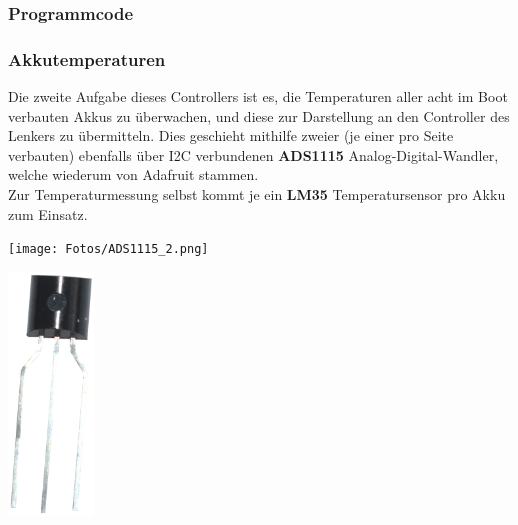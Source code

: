 \newpage
\subsubsection{Programmcode}

\newpage

\subsubsection{Akkutemperaturen}
Die zweite Aufgabe dieses Controllers ist es, die Temperaturen aller acht im Boot verbauten Akkus zu überwachen, und diese zur Darstellung an den Controller des Lenkers zu übermitteln.
Dies geschieht mithilfe zweier (je einer pro Seite verbauten) ebenfalls über I2C verbundenen \textbf{ADS1115} Analog-Digital-Wandler, welche wiederum von Adafruit stammen.\\
Zur Temperaturmessung selbst kommt je ein \textbf{LM35} Temperatursensor pro Akku zum Einsatz.\\

\begin{minipage}{8cm}
    \centering
    \texttt{[image: Fotos/ADS1115\_2.png]}
\end{minipage}
\begin{minipage}{8cm}
    \centering
    \includegraphics[width=0.17\textwidth]{Fotos/LM35.png}
\end{minipage}\\
\vspace{0.5cm}

